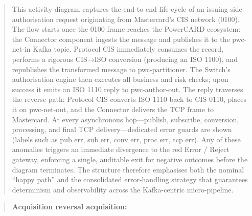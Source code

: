 \documentclass[12pt,a4paper]{report}
\begin{document}
\begin{quote}
This activity diagram captures the end-to-end life-cycle of an issuing-side authorisation request originating from Mastercard’s CIS network (0100).
The flow starts once the 0100 frame reaches the PowerCARD ecosystem: the Connector component ingests the message and publishes it to the pwc-net-in Kafka topic. Protocol CIS immediately consumes the record, performs a rigorous CIS→ISO conversion (producing an ISO 1100), and republishes the transformed message to pwc-partitioner. The Switch’s authorisation engine then executes all business and risk checks; upon success it emits an ISO 1110 reply to pwc-author-out.
The reply traverses the reverse path: Protocol CIS converts ISO 1110 back to CIS 0110, places it on pwc-net-out, and the Connector delivers the TCP frame to Mastercard.
At every asynchronous hop—publish, subscribe, conversion, processing, and final TCP delivery—dedicated error guards are shown (labels such as pub err, sub err, conv err, proc err, tcp err). Any of these anomalies triggers an immediate divergence to the red Error / Reject gateway, enforcing a single, auditable exit for negative outcomes before the diagram terminates. The structure therefore emphasises both the nominal “happy path” and the consolidated error-handling strategy that guarantees determinism and observability across the Kafka-centric micro-pipeline.
\end{quote}
\clearpage


\begin{quote}
\textbf{Acquisition reversal acquisition:}    
\end{quote}
    
\end{document}
